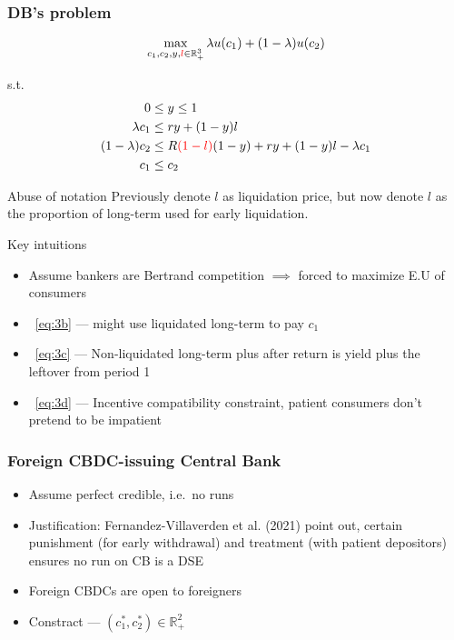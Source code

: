 \begin{frame}[allowframebreaks]
    \frametitle{DB's problem}

    \begin{equation}
        \max_{c_1, c_2, y, {\color{red} l} \in \mathbb{R}^3_+} 
        \lambda u(c_1) + (1-\lambda)u(c_2)
    \end{equation}

    s.t. 
    \begin{subequations}
        \begin{align}
            0 &\le y \le 1 \label{eq:3a} \\
            \lambda c_1 &\le ry + (1-y)l \label{eq:3b} \\
            (1-\lambda) c_2 &\le R{\color{red} (1-l)}(1-y) + ry + (1-y)l - \lambda c_1 \label{eq:3c} \\
            c_1 &\le c_2 \label{eq:3d}
        \end{align} \label{eq:db-constraint}
    \end{subequations}
    \begin{alertblock}{Abuse of notation}
        Previously denote $l$ as liquidation price, but now denote $l$ as the proportion of long-term used for early liquidation.        
    \end{alertblock}

    \framebreak 

    Key intuitions 
    \begin{itemize}
        \item Assume bankers are Bertrand competition $\implies$ forced to maximize E.U of consumers 
        \item~\ref{eq:3b} --- might use liquidated long-term to pay $c_1$
        \item~\ref{eq:3c} --- Non-liquidated long-term plus after return is yield plus the leftover from period 1
        \item~\ref{eq:3d} --- Incentive compatibility constraint, patient consumers don't pretend to be impatient
    \end{itemize}

\end{frame}

\begin{frame}
    \frametitle{Foreign CBDC-issuing Central Bank}

    \begin{itemize}
        \item Assume perfect credible, i.e.\ no runs
        \item Justification: Fernandez-Villaverden et al. (2021) point out, certain punishment (for early withdrawal) and treatment (with patient depositors) ensures no run on CB is a DSE
        \item Foreign CBDCs are open to foreigners
        \item Constract --- $(c^*_1, c^*_2)\in \mathbb{R}^2_+$
    \end{itemize}
\end{frame}

